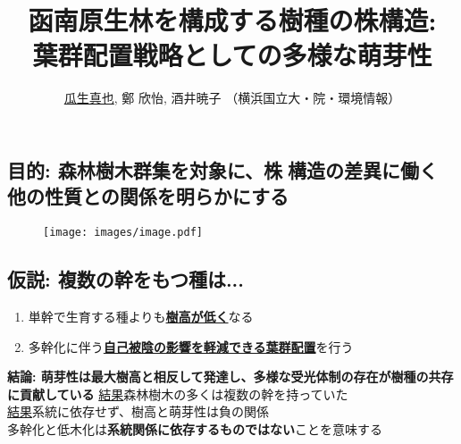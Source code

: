 \documentclass[a0, 30pt, plainboxedsections]{sciposter} %
\title{\textcolor{Blue1}{函南原生林を構成する樹種の株構造:\\\vspace{-0.2em} 葉群配置戦略としての多様な萌芽性}}
\author{\underline{瓜生真也}, 鄭 欣怡, 酒井暁子 （横浜国立大・院・環境情報） \normalsize{\faEnvelope \hspace{0.02em} \fontspec{GillSans-Italic}{suika1127@gmail.com}}}
\begin{document}
\maketitle
\vspace{-2em}
\begin{multicols}{2}
\begin{mdframed}[style=section.frame]
  \centering\huge\textbf{}
\end{mdframed}

\subsection*{目的: 森林樹木群集を対象に、株構造の差異に働く\\他の性質との関係を明らかにする}

\begin{figure}
  \centering\texttt{[image: images/image.pdf]}
\end{figure}

\vspace{-0.8em}
\subsection*{仮説: 複数の幹をもつ種は...}

\begin{enumerate}\setlength{\itemindent}{1em}
\item 単幹で生育する種よりも\underline{\textbf{樹高が低く}}なる
\item 多幹化に伴う\underline{\textbf{自己被陰の影響を軽減できる葉群配置}}を行う
\end{enumerate}

\columnbreak
\begin{mdframed}[style=conclusion.frame]
  \large\textbf{\faFlagAlt \vspace{0.02em} 結論: {萌芽性は最大樹高と相反して発達し、多様な受光体制の存在が樹種の共存に貢献している}} %
  \vspace{0.4em}
  \flushleft
  \normalsize{\underline{結果}森林樹木の多くは複数の幹を持っていた\\
  \underline{結果}系統に依存せず、樹高と萌芽性は負の関係\\
  }
  \large{\faHandLeft \vspace{0.02em} 多幹化と低木化は\textbf{系統関係に依存するものではない}ことを意味する} %
  

\end{mdframed}
\end{multicols}
\end{document}
